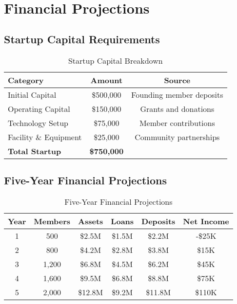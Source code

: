 \documentclass[11pt,letterpaper]{article}
\begin{document}
\section{Financial Projections}

\subsection{Startup Capital Requirements}

\begin{table}[h]
\centering
\begin{tabular}{@{}lcc@{}}
\toprule
\textbf{Category} & \textbf{Amount} & \textbf{Source} \\
\midrule
Initial Capital & \$500,000 & Founding member deposits \\
Operating Capital & \$150,000 & Grants and donations \\
Technology Setup & \$75,000 & Member contributions \\
Facility \& Equipment & \$25,000 & Community partnerships \\
\midrule
\textbf{Total Startup} & \textbf{\$750,000} & \\
\bottomrule
\end{tabular}
\caption{Startup Capital Breakdown}
\end{table}

\subsection{Five-Year Financial Projections}

\begin{table}[h]
\centering
\begin{tabular}{@{}cccccc@{}}
\toprule
\textbf{Year} & \textbf{Members} & \textbf{Assets} & \textbf{Loans} & \textbf{Deposits} & \textbf{Net Income} \\
\midrule
1 & 500 & \$2.5M & \$1.5M & \$2.2M & -\$25K \\
2 & 800 & \$4.2M & \$2.8M & \$3.8M & \$15K \\
3 & 1,200 & \$6.8M & \$4.5M & \$6.2M & \$45K \\
4 & 1,600 & \$9.5M & \$6.8M & \$8.8M & \$75K \\
5 & 2,000 & \$12.8M & \$9.2M & \$11.8M & \$110K \\
\bottomrule
\end{tabular}
\caption{Five-Year Financial Projections}
\end{table}
\end{document}

